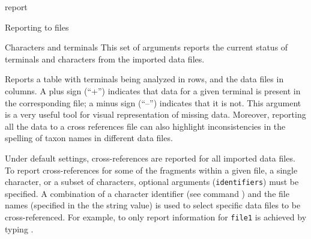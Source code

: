 \begin{command}{report}{}
\begin{arguments}
\begin{argumentgroup}{Reporting to files}{}
                              
        \end{argumentgroup}
                
	\begin{argumentgroup}{Characters and terminals}
            {This set of arguments reports the current status of terminals and
            characters from the imported data files. }
		

                {Reports a table with terminals being analyzed in rows, and the
                data files in columns. A plus sign (``+'') indicates that data for a given
                terminal is
                present in the corresponding file; a minus sign (``--'') indicates that it is
                not. This argument is a very useful tool for visual
                representation of missing data.  Moreover, reporting all the data to a 
                cross references file can also highlight inconsistencies in the spelling 
                of taxon names in different data files.
                
                  \setlength{\parindent}{0.5cm}                                
                \indent 
                Under default settings, cross-references are reported for
                all imported data files. To report cross-references for some of
                the fragments within a given file, a single character, or a subset
                of characters, optional arguments (\texttt{identifiers}) must be specified. A combination of
                a character identifier (see command  ) and
                the file names (specified in the the string value) is used to select specific
                data files to be cross-referenced. For example, to only report information  
                for \texttt{file1}  is achieved by typing .
                
}
\end{argumentgroup}
\end{arguments}
\end{command}
